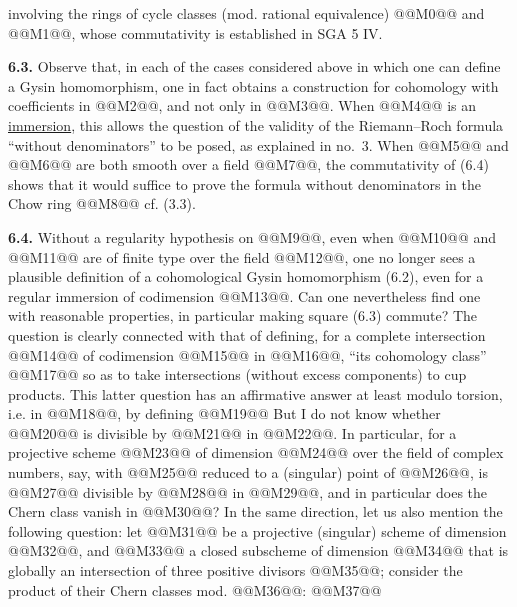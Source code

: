 involving the rings of cycle classes (mod. rational equivalence) @@M0@@ and @@M1@@, whose commutativity is established in SGA 5 IV.

\textbf{6.3.} Observe that, in each of the cases considered above in which one can define a Gysin homomorphism, one in fact obtains a construction for cohomology with coefficients in @@M2@@, and not only in @@M3@@. When @@M4@@ is an \uline{immersion}, this allows the question of the validity of the Riemann--Roch formula ``without denominators'' to be posed, as explained in no.~3. When @@M5@@ and @@M6@@ are both smooth over a field @@M7@@, the commutativity of (6.4) shows that it would suffice to prove the formula without denominators in the Chow ring @@M8@@ cf. (3.3).

\textbf{6.4.} Without a regularity hypothesis on @@M9@@, even when @@M10@@ and @@M11@@ are of finite type over the field @@M12@@, one no longer sees a plausible definition of a cohomological Gysin homomorphism (6.2), even for a regular immersion of codimension @@M13@@. Can one nevertheless find one with reasonable properties, in particular making square (6.3) commute? The question is clearly connected with that of defining, for a complete intersection @@M14@@ of codimension @@M15@@ in @@M16@@, ``its cohomology class''
@@M17@@
so as to take intersections (without excess components) to cup products. This latter question has an affirmative answer at least modulo torsion, i.e. in @@M18@@, by defining
@@M19@@
But I do not know whether @@M20@@ is divisible by @@M21@@ in @@M22@@. In particular, for a projective scheme @@M23@@ of dimension @@M24@@ over the field of complex numbers, say, with @@M25@@ reduced to a (singular) point of @@M26@@, is @@M27@@ divisible by @@M28@@ in @@M29@@, and in particular does the Chern class vanish in @@M30@@? In the same direction, let us also mention the following question: let @@M31@@ be a projective (singular) scheme of dimension @@M32@@, and @@M33@@ a closed subscheme of dimension @@M34@@ that is globally an intersection of three positive divisors @@M35@@; consider the product of their Chern classes mod. @@M36@@:
@@M37@@
